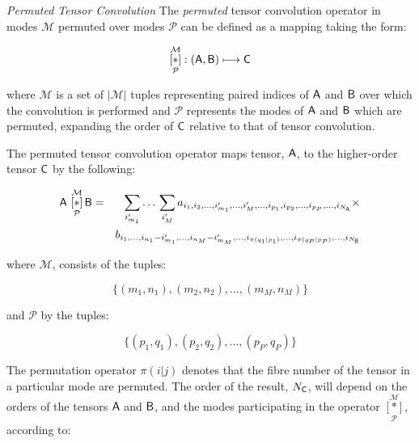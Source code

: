 \begin{definition}{\textit{Permuted Tensor Convolution}} \label{def:permconvop} The \textit{permuted} tensor convolution operator in modes $\mathcal{M}$ permuted over modes $\mathcal{P}$ can be defined as a mapping taking the form:

\begin{equation}
 \underset{\mathcal{P}}{\overset{\mathcal{M}}{[ \ast ]}}: \left (\mathsf{A},\mathsf{B}  \right ) \longmapsto \mathsf{C}
 \end{equation}
 
 where $\mathcal{M}$ is a set of $|\mathcal{M}|$ tuples representing paired indices of $\mathsf{A}$ and $\mathsf{B}$ over which the convolution is performed and $\mathcal{P}$ represents the modes of $\mathsf{A}$ and $\mathsf{B}$ which are permuted, expanding the order of $\mathsf{C}$ relative to that of tensor convolution.

The permuted tensor convolution operator maps tensor, $\mathsf{A}$, to the higher-order tensor $\mathsf{C}$ by the following:

\begin{eqnarray}
\mathsf{A}\,\,\underset{\mathcal{P}}{\overset{\mathcal{M}}{[ \ast ]}}\, {\mathsf{B}} &=& \sum_{i'_{m_1}}\ldots\,\sum_{i_{M}'}  a_{i_1,i_2,...,i_{m_1}',...,i_{M}',...,i_{p_1},i_{p_2},...,i_{p_P},...,i_{N_{\mathsf{A}}}} \times \nonumber \\
 & &b_{i_1,...,i_{n_1}-i_{m_1}',...,i_{n_M}-i_{m_M}',...,i_{\pi(q_1|p_1)},...,i_{\pi(q_P|p_P)},...,i_{N_{\mathsf{B}}}}
\label{eq:t2}
\end{eqnarray}

where $\mathcal{M}$, consists of the tuples:

\begin{equation}
\lbrace(m_1,n_1),(m_2,n_2),...,(m_{M},n_{M})\rbrace
\end{equation}

and $\mathcal{P}$ by the tuples:

\begin{equation}
\lbrace(p_1,q_1),(p_2,q_2),...,(p_{P},q_{P})\rbrace
\end{equation}

The permutation operator $\pi(i|j)$ denotes that the fibre number of the tensor in a particular mode are permuted.  The order of the result, $N_{\mathsf{C}}$, will depend on the orders of the tensors $\mathsf{A}$ and $\mathsf{B}$, and the modes participating in the operator $\underset{\mathcal{P}}{\overset{\mathcal{M}}{[ \ast ]}}$, according to:


\end{definition}

